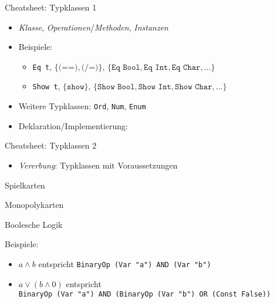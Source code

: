 \documentclass{beamer}
\begin{document}
\begin{frame}{Cheatsheet: Typklassen 1}
  \begin{itemize}
    \item \emph{Klasse}, \emph{Operationen}/\emph{Methoden}, \emph{Instanzen}
    \item Beispiele:
    \begin{itemize}
      \item \texttt{Eq t}, $\{ \texttt{(==)}, \texttt{(/=)} \}$, $\{ \texttt{Eq Bool}, \texttt{Eq Int}, \texttt{Eq Char}, ... \}$
      \item \texttt{Show t}, $\{ \texttt{show} \}$, $\{ \texttt{Show Bool}, \texttt{Show Int}, \texttt{Show Char}, ... \}$
    \end{itemize}
    \item Weitere Typklassen: \texttt{Ord}, \texttt{Num}, \texttt{Enum}
    \item Deklaration/Implementierung:
  \end{itemize}

\end{frame}

\begin{frame}{Cheatsheet: Typklassen 2}
  \begin{itemize}
    \item \emph{Vererbung}: Typklassen mit Voraussetzungen
  \end{itemize}

\end{frame}

\begin{frame}{Spielkarten}
\end{frame}

\begin{frame}{Monopolykarten}
\end{frame}

\begin{frame}{Boolesche Logik}

  \vfill

  Beispiele:
  \begin{itemize}
    \item $a \wedge b$ entspricht \texttt{BinaryOp (Var "{}a"{}) AND (Var "{}b"{})}
    \item $a \vee (b \wedge 0)$ entspricht\\
          \texttt{BinaryOp (Var "{}a"{}) AND (BinaryOp (Var "{}b"{}) OR (Const False))}
  \end{itemize}
\end{frame}
\end{document}

